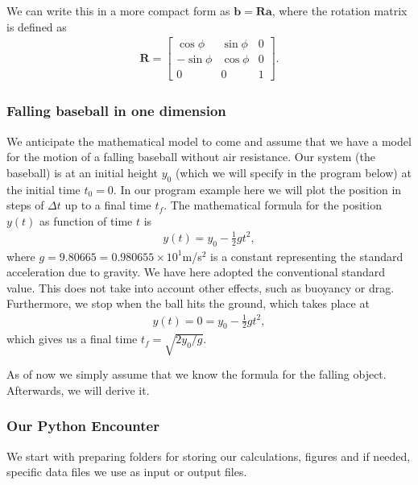 \documentclass[letterpaper,10pt,english]{sphinxmanual}
\begin{document}
We can write this in a more compact form as \(\boldsymbol{b} = \boldsymbol{R}\boldsymbol{a}\), where the rotation matrix is defined as
\begin{equation*}
\begin{split}
\boldsymbol{R} = \begin{bmatrix} \cos{\phi} & \sin{\phi} & 0 \\ -\sin{\phi} & \cos{\phi} & 0 \\ 0 & 0 & 1\end{bmatrix}.
\end{split}
\end{equation*}

\subsubsection{Falling baseball in one dimension}
\label{\detokenize{chapter2:falling-baseball-in-one-dimension}}
We anticipate the mathematical model to come and assume that we have a
model for the motion of a falling baseball without air resistance.
Our system (the baseball) is at an initial height \(y_0\) (which we will
specify in the program below) at the initial time \(t_0=0\). In our program example here we will plot the position in steps of \(\Delta t\) up to a final time \(t_f\).
The mathematical formula for the position \(y(t)\) as function of time \(t\) is
\begin{equation*}
\begin{split}
y(t) = y_0-\frac{1}{2}gt^2,
\end{split}
\end{equation*}
where \(g=9.80665=0.980655\times 10^1\)m/s\({}^2\) is a constant representing the standard acceleration due to gravity.
We have here adopted the conventional standard value. This does not take into account other effects, such as buoyancy or drag.
Furthermore, we stop when the ball hits the ground, which takes place at
\begin{equation*}
\begin{split}
y(t) = 0= y_0-\frac{1}{2}gt^2,
\end{split}
\end{equation*}
which gives us a final time \(t_f=\sqrt{2y_0/g}\).

As of now we simply assume that   we know the formula for the falling object. Afterwards, we will derive it.


\subsubsection{Our Python Encounter}
\label{\detokenize{chapter2:our-python-encounter}}
We start with preparing folders for storing our calculations, figures and if needed, specific data files we use as input or output files.
\end{document}

